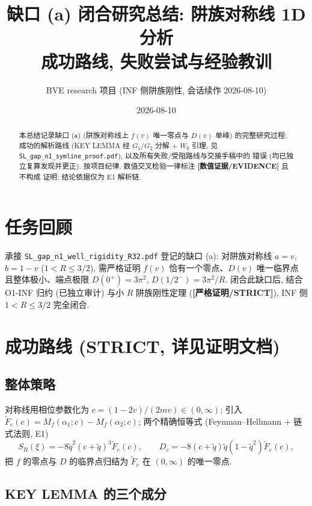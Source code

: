 \documentclass[UTF8]{ctexart}
\title{缺口 (a) 闭合研究总结: 阱族对称线 1D 分析\\
\large 成功路线, 失败尝试与经验教训}
\author{BVE research 项目 (INF 侧阱族刚性, 会话续作 2026-08-10)}
\date{2026-08-10}
\newcommand{\STRICT}{\textbf{[严格证明/STRICT]}}
\newcommand{\EVID}{\textbf{[数值证据/EVIDENCE]}}
\begin{document}
\maketitle

\begin{abstract}
本总结记录缺口 (a) (阱族对称线上 $f(v)$ 唯一零点与 $D(v)$ 单峰) 的完整研究过程:
成功的解析路线 (KEY LEMMA 经 $G_1/G_2$ 分解 + $W_0$ 引理, 见
\texttt{SL\_gap\_n1\_symline\_proof.pdf}), 以及所有失败/受阻路线与交接手稿中的
错误 (均已独立复算发现并更正). 按项目纪律, 数值交叉检验一律标注 \EVID{} 且不构成
证明; 结论依据仅为 E1 解析链.
\end{abstract}

\tableofcontents

\section{任务回顾}

承接 \texttt{SL\_gap\_n1\_well\_rigidity\_R32.pdf} 登记的缺口 (a): 对阱族对称线
$a=v$, $b=1-v$ ($1<R\le3/2$), 需严格证明 $f(v)$ 恰有一个零点、$D(v)$ 唯一临界点
且整体极小、端点极限 $D(0^+)=3\pi^2$, $D(1/2^-)=3\pi^2/R$. 闭合此缺口后, 结合
O1-INF 归约 (已独立审计) 与小 $R$ 阱族刚性定理 (\STRICT), INF 侧
$1<R\le3/2$ 完全闭合.

\section{成功路线 (STRICT, 详见证明文档)}

\subsection{整体策略}

对称线用相位参数化为 $c=(1-2v)/(2mv)\in(0,\infty)$; 引入
$\widetilde F_e(c)=M_f(\alpha_1;c)-M_f(\alpha_2;c)$; 两个精确恒等式
(Feynman--Hellmann + 链式法则, E1)
\begin{equation}
	S_R(\xi)=-8\tilde q^2(c+\tilde q)^3\widetilde F_e(c),\qquad
	D_c=-8(c+\tilde q)\tilde q(1-\tilde q^2)\widetilde F_e(c),
\end{equation}
把 $f$ 的零点与 $D$ 的临界点归结为 $\widetilde F_e$ 在 $(0,\infty)$ 的唯一零点.

\subsection{KEY LEMMA 的三个成分}
\end{document}
